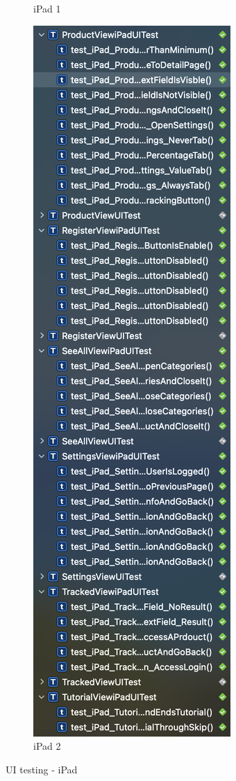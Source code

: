 \begin{figure}[h!]
\begin{subfigure}[b]{0.3\textwidth}
            \caption{iPad 1}
            \label{fig:ui_testing_ipad_1}
        \end{subfigure}
        \begin{subfigure}[b]{0.3\textwidth}
            \centering
            \includegraphics[width=\textwidth]{images/testing/ui_testing_ipad_2.png}
            \caption{iPad 2}
            \label{fig:ui_testing_ipad_2}
        \end{subfigure}
         \caption{UI testing - iPad}
        \label{fig:ui_testing_ipad}
\end{figure}
